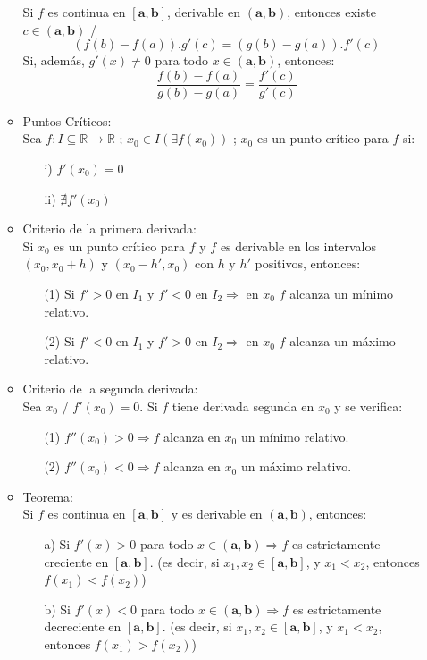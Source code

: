 \documentclass[a4paper,11pt]{report}
\begin{document}
\begin{itemize}
\begin{itemize}
Si $f$ es continua en $\mathbf{[a,b]}$, derivable en $\mathbf{(a,b)}$, entonces existe $c \in \mathbf{(a,b)}$ / \\
$$(f(b)-f(a)).g'(c)=(g(b)-g(a)).f'(c)$$
Si, además, $g'(x) \neq 0$ para todo $x \in \mathbf{(a,b)}$, entonces: \\
$$\frac{f(b)-f(a)}{g(b)-g(a)}=\frac{f'(c)}{g'(c)}$$
\item Puntos Críticos: \\
Sea $f:I \subseteq \mathbb{R} \to \mathbb{R}$ ; $x_0 \in I (\exists f(x_0))$ ; $x_0$ es un punto crítico para $f$ si:
\begin{itemize}
\item[i)] $f'(x_0) = 0$
\item[ii)] $\nexists f'(x_0)$
\end{itemize}
\item Criterio de la primera derivada: \\
Si $x_0$ es un punto crítico para $f$ y $f$ es derivable en los intervalos $(x_0, x_0+h)$ y $(x_0-h', x_0)$ con $h$ y $h'$ positivos, entonces:
\begin{itemize}
\item[(1)] Si $f'>0$ en $I_1$ y $f'<0$ en $I_2 \Longrightarrow$ en $x_0$  $f$ alcanza un mínimo relativo.
\item[(2)] Si $f'<0$ en $I_1$ y $f'>0$ en $I_2 \Longrightarrow$ en $x_0$  $f$ alcanza un máximo relativo.
\end{itemize}
\item Criterio de la segunda derivada: \\
Sea $x_0$ / $f'(x_0)=0$. Si $f$ tiene derivada segunda en $x_0$ y se verifica:
\begin{itemize}
\item[(1)] $f''(x_0)>0 \Longrightarrow f$ alcanza en $x_0$ un mínimo relativo.
\item[(2)] $f''(x_0)<0 \Longrightarrow f$ alcanza en $x_0$ un máximo relativo.
\end{itemize}
\item Teorema: \\
Si $f$ es continua en $\mathbf{[a,b]}$ y es derivable en $\mathbf{(a,b)}$, entonces:
\begin{itemize}
\item[a)] Si $f'(x)>0$ para todo $x \in \mathbf{(a,b)} \Longrightarrow f$ es estrictamente creciente en $\mathbf{[a,b]}$. (es decir, si $x_1,x_2 \in \mathbf{[a,b]}$, y $x_1<x_2$, entonces $f(x_1)<f(x_2)$)
\item[b)] Si $f'(x)<0$ para todo $x \in \mathbf{(a,b)} \Longrightarrow f$ es estrictamente decreciente en $\mathbf{[a,b]}$. (es decir, si $x_1,x_2 \in \mathbf{[a,b]}$, y $x_1<x_2$, entonces $f(x_1)>f(x_2)$)

\end{itemize}
\end{itemize}
\end{itemize}
\end{document}
